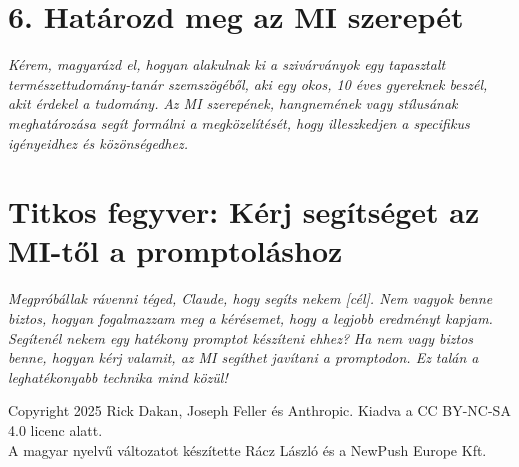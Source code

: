 \documentclass[a4paper, 11pt]{article}
\begin{document}
\section*{6. Határozd meg az MI szerepét}
\textit{Kérem, magyarázd el, hogyan alakulnak ki a szivárványok egy tapasztalt természettudomány-tanár szemszögéből, aki egy okos, 10 éves gyereknek beszél, akit érdekel a tudomány.}
\textit{Az MI szerepének, hangnemének vagy stílusának meghatározása segít formálni a megközelítését, hogy illeszkedjen a specifikus igényeidhez és közönségedhez.}

\section*{Titkos fegyver: Kérj segítséget az MI-től a promptoláshoz}
\textit{Megpróbállak rávenni téged, Claude, hogy segíts nekem [cél]. Nem vagyok benne biztos, hogyan fogalmazzam meg a kérésemet, hogy a legjobb eredményt kapjam. Segítenél nekem egy hatékony promptot készíteni ehhez?}
\textit{Ha nem vagy biztos benne, hogyan kérj valamit, az MI segíthet javítani a promptodon. Ez talán a leghatékonyabb technika mind közül!}

\vspace{\fill}
\begin{center}
    \small{Copyright 2025 Rick Dakan, Joseph Feller és Anthropic. Kiadva a CC BY-NC-SA 4.0 licenc alatt.\\A magyar nyelvű változatot készítette Rácz László és a NewPush Europe Kft.}
\end{center}
\end{document}
